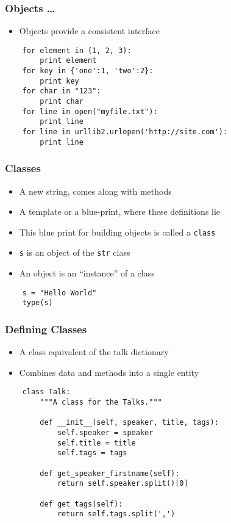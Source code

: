\begin{frame}[fragile]
  \frametitle{Objects \ldots}
  \begin{itemize}
  \item Objects provide a consistent interface
  \end{itemize}
  \begin{lstlisting}
    for element in (1, 2, 3):
        print element
    for key in {'one':1, 'two':2}:
        print key
    for char in "123":
        print char
    for line in open("myfile.txt"):
        print line
    for line in urllib2.urlopen('http://site.com'):
        print line
  \end{lstlisting}
\end{frame}

\begin{frame}[fragile]
  \frametitle{Classes}
  \begin{itemize}
  \item A new string, comes along with methods
  \item A template or a blue-print, where these definitions lie
  \item This blue print for building objects is called a
    \texttt{class}
  \item \texttt{s} is an object of the \texttt{str} class
  \item An object is an ``instance'' of a class
  \end{itemize}
  \begin{lstlisting}
    s = "Hello World"
    type(s)
  \end{lstlisting}
\end{frame}

\begin{frame}[fragile]
  \frametitle{Defining Classes}
  \begin{itemize}
  \item A class equivalent of the talk dictionary
  \item Combines data and methods into a single entity
  \end{itemize}
  \begin{lstlisting}
    class Talk:
        """A class for the Talks."""

        def __init__(self, speaker, title, tags):
            self.speaker = speaker
            self.title = title
            self.tags = tags

        def get_speaker_firstname(self):
            return self.speaker.split()[0]

        def get_tags(self):
            return self.tags.split(',')
  \end{lstlisting}
\end{frame}

